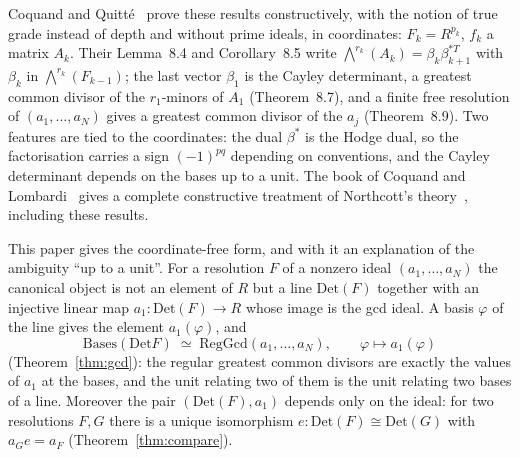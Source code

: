 \documentclass[11pt]{amsart}
\theoremstyle{definition}
\theoremstyle{remark}
\newcommand{\Det}{\mathrm{Det}}
\newcommand{\Bases}{\mathrm{Bases}}
\newcommand{\RegGcd}{\mathrm{RegGcd}}
\newcommand{\Ex}{{\textstyle\bigwedge}}
\begin{document}
Coquand and Quitt\'e~\cite{CQ} prove these results constructively, with
the notion of true grade instead of depth and without prime ideals, in
coordinates: $F_k=R^{p_k}$, $f_k$ a matrix $A_k$.  Their Lemma~8.4 and
Corollary~8.5 write $\Ex^{r_k}(A_k)=\beta_k\beta_{k+1}^{*T}$ with
$\beta_k$ in $\Ex^{r_k}(F_{k-1})$; the last vector $\beta_1$ is the
Cayley determinant, a greatest common divisor of the $r_1$-minors of
$A_1$ (Theorem~8.7), and a finite free resolution of
$(a_1,\dots,a_N)$ gives a greatest common divisor of the $a_j$
(Theorem~8.9).  Two features are tied to the coordinates: the dual
$\beta^*$ is the Hodge dual, so the factorisation carries a sign
$(-1)^{pq}$ depending on conventions, and the Cayley determinant depends
on the bases up to a unit.  The book of Coquand and Lombardi~\cite{CL}
gives a complete constructive treatment of Northcott's theory~\cite{N},
including these results.

This paper gives the coordinate-free form, and with it an explanation of
the ambiguity ``up to a unit''.  For a resolution $F$ of a nonzero ideal
$(a_1,\dots,a_N)$ the canonical object is not an element of $R$ but a line
$\Det(F)$ together with an injective linear map $a_1:\Det(F)\to R$ whose
image is the gcd ideal.  A basis $\varphi$ of the line gives the element
$a_1(\varphi)$, and
\[\Bases(\Det F)\;\simeq\;\RegGcd(a_1,\dots,a_N),\qquad\varphi\mapsto
a_1(\varphi)\]
(Theorem~\ref{thm:gcd}): the regular greatest common divisors are exactly
the values of $a_1$ at the bases, and the unit relating two of them is the
unit relating two bases of a line.  Moreover the pair $(\Det(F),a_1)$
depends only on the ideal: for two resolutions $F,G$ there is a unique
isomorphism $e:\Det(F)\cong\Det(G)$ with $a_Ge=a_F$
(Theorem~\ref{thm:compare}).
\end{document}
